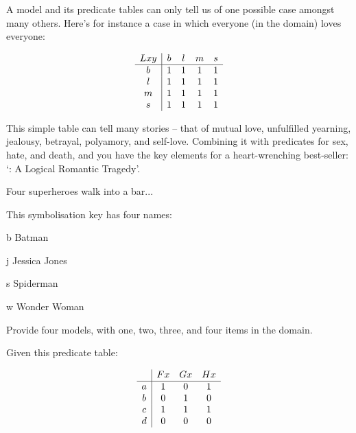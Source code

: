 \documentclass[PHIL101-Textbook.tex]{subfiles}
\begin{document}
A model and its predicate tables can only tell us of one possible case amongst many others. Here's for instance a case in which everyone (in the domain) loves everyone: 


\[\begin{array}{c|cccc}
	\mathord{L}{x y} & b & l & m & s\\ \hline
	b & 1 & 1 & 1 & 1 \\
	l & 1 & 1 & 1 & 1\\
	m & 1 & 1 & 1 & 1\\
	s & 1 & 1 & 1 & 1	
\end{array} \]

This simple table can tell many stories -- that of mutual love, unfulfilled yearning, jealousy, betrayal, polyamory, and self-love. Combining it with predicates for sex, hate, and death, and you have the key elements for a heart-wrenching best-seller: `\pl: A Logical Romantic Tragedy'.







\pagebreak
\practiceproblems
\problempart
\label{pr.predicate-tables} Four superheroes walk into a bar...

This symbolisation key has four names:

\begin{ekey}
\item[b] Batman
\item[j] Jessica Jones
\item[s] Spiderman
\item[w] Wonder Woman
\end{ekey}

Provide four models, with one, two, three, and four items in the domain. 



\problempart
\label{pr.predicate-tables1}
Given this predicate table:

\[\begin{array}{c|ccc}
		&\mathord{F}{x}& \mathord{G}{x}& \mathord{H}{x}\\ \hline
	  a & 1 & 0 & 1\\
	  b & 0 & 1 & 0\\
	  c & 1 & 1 & 1\\
	  d & 0 & 0 & 0
	\end{array}\]
\end{document}
